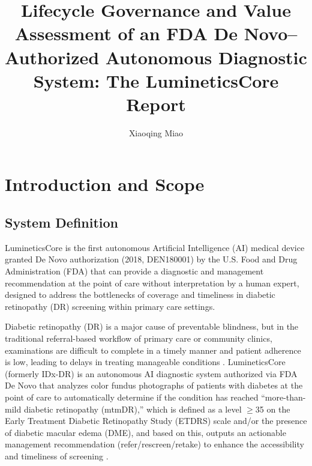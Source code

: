 \documentclass[sigplan,screen]{acmart}
\begin{document}
\title[LumineticsCore Report]{Lifecycle Governance and Value Assessment of an FDA De Novo--Authorized Autonomous Diagnostic System: The LumineticsCore Report}

\author{Xiaoqing Miao}


\renewcommand{\shortauthors}{Xiaoqing Miao}

\maketitle

\section{Introduction and Scope}

\subsection{System Definition}

LumineticsCore is the first autonomous Artificial Intelligence (AI) medical device granted De Novo authorization (2018, DEN180001) by the U.S. Food and Drug Administration (FDA) that can provide a diagnostic and management recommendation at the point of care without interpretation by a human expert, designed to address the bottlenecks of coverage and timeliness in diabetic retinopathy (DR) screening within primary care settings.

Diabetic retinopathy (DR) is a major cause of preventable blindness, but in the traditional referral-based workflow of primary care or community clinics, examinations are difficult to complete in a timely manner and patient adherence is low, leading to delays in treating manageable conditions \cite{wolf2024autonomous}. LumineticsCore (formerly IDx-DR) is an autonomous AI diagnostic system authorized via FDA De Novo \cite{fda2018denovo} that analyzes color fundus photographs of patients with diabetes at the point of care to automatically determine if the condition has reached ``more-than-mild diabetic retinopathy (mtmDR),'' which is defined as a level $\geq$35 on the Early Treatment Diabetic Retinopathy Study (ETDRS) scale and/or the presence of diabetic macular edema (DME), and based on this, outputs an actionable management recommendation (refer/rescreen/retake) to enhance the accessibility and timeliness of screening \cite{digitaldiagnostics2024indications}.
\end{document}
